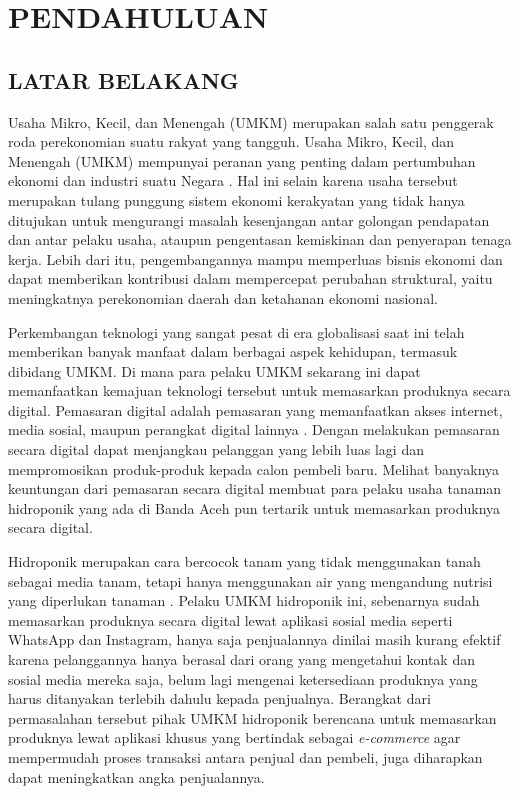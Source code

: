 \fancyhf{} 
\fancyfoot[C]{\thepage}

\chapter{PENDAHULUAN}

\section{\uppercase{LATAR BELAKANG}}
Usaha Mikro, Kecil, dan Menengah (UMKM) merupakan salah satu penggerak roda perekonomian suatu rakyat yang tangguh. Usaha Mikro, Kecil, dan Menengah (UMKM) mempunyai peranan yang penting dalam pertumbuhan ekonomi dan industri suatu Negara \citep{prastika2014pengaruh}. Hal ini selain karena usaha tersebut merupakan tulang punggung sistem ekonomi kerakyatan yang tidak hanya ditujukan untuk mengurangi masalah kesenjangan antar golongan pendapatan dan antar pelaku usaha, ataupun pengentasan kemiskinan dan penyerapan tenaga kerja. Lebih dari itu, pengembangannya mampu memperluas bisnis ekonomi dan dapat memberikan kontribusi dalam mempercepat perubahan struktural, yaitu meningkatnya perekonomian daerah dan ketahanan ekonomi nasional.

\par Perkembangan teknologi yang sangat pesat di era globalisasi saat ini telah memberikan banyak manfaat dalam berbagai aspek kehidupan, termasuk dibidang UMKM. Di mana para pelaku UMKM sekarang ini dapat memanfaatkan kemajuan teknologi tersebut untuk memasarkan produknya secara digital. Pemasaran digital adalah pemasaran yang memanfaatkan akses internet, media sosial, maupun perangkat digital lainnya \citep{hardilawati2020strategi}. Dengan melakukan pemasaran secara digital dapat menjangkau pelanggan yang lebih luas lagi dan mempromosikan produk-produk kepada calon pembeli baru. Melihat banyaknya keuntungan dari pemasaran secara digital membuat para pelaku usaha tanaman hidroponik yang ada di Banda Aceh pun tertarik untuk memasarkan produknya secara digital.

\par Hidroponik merupakan cara bercocok tanam yang tidak menggunakan tanah sebagai media tanam, tetapi hanya menggunakan air yang mengandung nutrisi yang diperlukan tanaman \citep{prayitno2017sistem}. Pelaku UMKM hidroponik ini, sebenarnya sudah memasarkan produknya secara digital lewat aplikasi sosial media seperti WhatsApp dan Instagram, hanya saja penjualannya dinilai masih kurang efektif karena pelanggannya hanya berasal dari orang yang mengetahui kontak dan sosial media mereka saja, belum lagi mengenai ketersediaan produknya yang harus ditanyakan terlebih dahulu kepada penjualnya. Berangkat dari permasalahan tersebut pihak UMKM hidroponik berencana untuk memasarkan produknya lewat aplikasi khusus yang bertindak sebagai \textit{e-commerce} agar mempermudah proses transaksi antara penjual dan pembeli, juga diharapkan dapat meningkatkan angka penjualannya.

